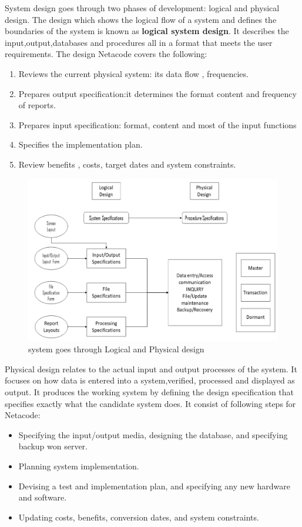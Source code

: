 \documentclass[a4paper,12pt]{report}
\begin{document}
System design goes through two phases of development: logical and physical design. The design which shows the logical flow of a system and defines the boundaries of the system is known as \textbf{logical system design}. It describes the input,output,databases and procedures all in a format that meets the user requirements. The design Netacode covers the following: 
\begin{enumerate}
	\item	Reviews the current physical system: its data flow , frequencies.
	\item 	Prepares output specification:it determines the format content and frequency of reports.
	\item 	Prepares input specification: format, content and most of the input functions
	\item 	Specifies the implementation plan.
	\item	Review benefits , costs, target dates and system constraints.
\end{enumerate}
\begin{figure}[h]
	\centering
	\includegraphics[width=0.9\linewidth]{9_1}
	\caption{system goes through Logical and Physical design}
	\label{fig:91}
\end{figure}
Physical design relates to the actual input and output processes of the system. It focuses on how data is entered into a system,verified, processed and displayed as output. It produces the working system by defining the design specification that specifies exactly what the candidate system does. It consist of following steps for Netacode:	

\begin{itemize}
	\item Specifying the input/output media, designing the database, and specifying    backup won server.
	\item  Planning system implementation.
	\item  Devising a test and implementation plan, and specifying any new hardware         and software.
	\item  Updating costs, benefits, conversion dates, and system constraints.
	
\end{itemize}
\end{document}
